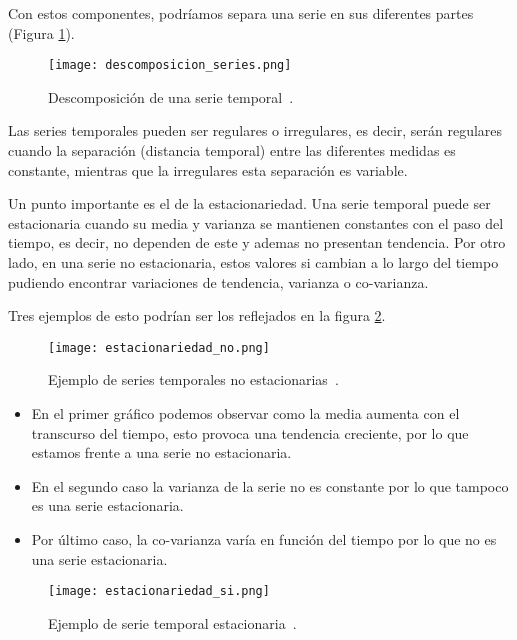 Con estos componentes, podríamos separa una serie en sus diferentes partes (Figura \ref{descomposicion_series}).

\begin{figure}%
	\centering
	\texttt{[image: descomposicion\_series.png]}
	\caption[Descomposición de una serie temporal]{Descomposición de una serie temporal~\cite{SeriesTemp}.}\label{descomposicion_series}
\end{figure}

Las series temporales pueden ser regulares o irregulares, es decir, serán regulares cuando la separación (distancia temporal) entre las diferentes medidas es constante, mientras que la irregulares esta separación es variable.

Un punto importante es el de la estacionariedad. Una serie temporal puede ser estacionaria cuando su media y varianza se mantienen constantes con el paso del tiempo, es decir, no dependen de este y ademas no presentan tendencia. Por otro lado, en una serie no estacionaria, estos valores si cambian a lo largo del tiempo pudiendo encontrar variaciones de tendencia, varianza o co-varianza.

Tres ejemplos de esto podrían ser los reflejados en la figura \ref{series_no_estacionarias}.

\begin{figure}%
	\centering
	\texttt{[image: estacionariedad\_no.png]}
	\caption[Ejemplo de series temporales no estacionarias]{Ejemplo de series temporales no estacionarias~\cite{SeriesTempIMG}.}\label{series_no_estacionarias}
\end{figure}

\begin{itemize}
	\item En el primer gráfico podemos observar como la media aumenta con el transcurso del tiempo, esto provoca una tendencia creciente, por lo que estamos frente a una serie no estacionaria.
	\item En el segundo caso la varianza de la serie no es constante por lo que tampoco es una serie estacionaria.
	\item Por último caso, la co-varianza varía en función del tiempo por lo que no es una serie estacionaria. 
\end{itemize}

\begin{figure}%
	\centering
	\texttt{[image: estacionariedad\_si.png]}
	\caption[Ejemplo de serie temporal estacionaria]{Ejemplo de serie temporal estacionaria~\cite{SeriesTempIMG}.}\label{serie_si_estacionaria}
\end{figure}

